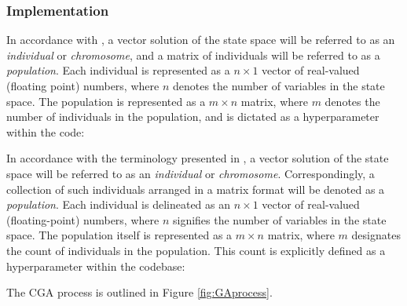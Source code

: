 \documentclass[10pt]{article}
\begin{document}
\begin{multicols}{2}
\subsubsection{Implementation}
\label{sec:CGA_implementation}

In accordance with \cite{parks2023geneticalgorithms}, a vector solution of the state space will be referred to as an \textit{individual} or \textit{chromosome}, and a matrix of individuals will be referred to as a \textit{population}. Each individual is represented as a $n \times 1$ vector of real-valued (floating point) numbers, where $n$ denotes the number of variables in the state space. The population is represented as a $m \times n$ matrix, where $m$ denotes the number of individuals in the population, and is dictated as a hyperparameter within the code: %

In accordance with the terminology presented in \cite{parks2023geneticalgorithms}, a vector solution of the state space will be referred to as an \textit{individual} or \textit{chromosome}. Correspondingly, a collection of such individuals arranged in a matrix format will be denoted as a \textit{population}. Each individual is delineated as an $n \times 1$ vector of real-valued (floating-point) numbers, where $n$ signifies the number of variables in the state space. The population itself is represented as a $m \times n$ matrix, where $m$ designates the count of individuals in the population. This count is explicitly defined as a hyperparameter within the codebase: %

The CGA process is outlined in Figure \ref{fig:GAprocess}. 


\end{multicols}
\end{document}
